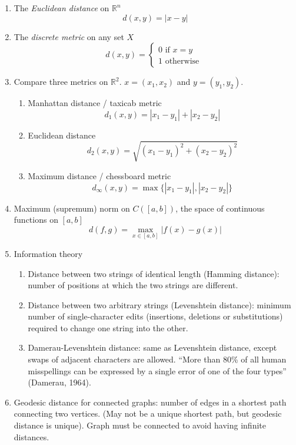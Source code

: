 \documentclass[10pt]{article}         %
\theoremstyle{remark}
\newcommand{\R}{\mathbb{R}}
\begin{document}
\begin{enumerate}
\item The \emph{Euclidean distance} on $\R^n$
\[
d(x,y) = |x-y|
\]
\item The \emph{discrete metric} on any set $X$
\[
d(x,y) = 
\begin{cases} 
    0 \text{ if } x=y \\
    1 \text{ otherwise }
\end{cases}
\]
\item Compare three metrics on $\R^2$. $x = (x_1, x_2)$ and $y = (y_1, y_2)$.
\begin{enumerate}
    \item Manhattan distance / taxicab metric
    \[
    d_1(x,y) = |x_1 - y_1| + |x_2 - y_2|
    \]
    \item Euclidean distance
    \[
    d_2(x,y) = \sqrt{ (x_1 - y_1)^2 + (x_2 - y_2)^2 }
    \]
    \item Maximum distance / chessboard metric
    \[
    d_\infty(x,y) = \max\{ |x_1 - y_1|,  |x_2 - y_2| \}
    \]
\end{enumerate}

\item Maximum (supremum) norm on $C([a, b])$, the space of continuous functions on $[a, b]$
\[
d(f, g) = \max_{x \in [a,b]}|f(x) - g(x)|
\]

\item Information theory
\begin{enumerate}
    \item Distance between two strings of identical length (Hamming distance): number of positions at which the two strings are different.
    \item Distance between two arbitrary strings (Levenshtein distance): minimum number of single-character edits (insertions, deletions or substitutions) required to change one string into the other.
    \item Damerau-Levenshtein distance: same as  Levenshtein distance, except swaps of adjacent characters are allowed. ``More than 80\% of all human misspellings can be expressed by a single error of one of the four types'' (Damerau, 1964).
\end{enumerate}
    
\item Geodesic distance for connected graphs: number of edges in a shortest path connecting two vertices. (May not be a unique shortest path, but geodesic distance is unique). Graph must be connected to avoid having infinite distances.

\end{enumerate}
\end{document}
